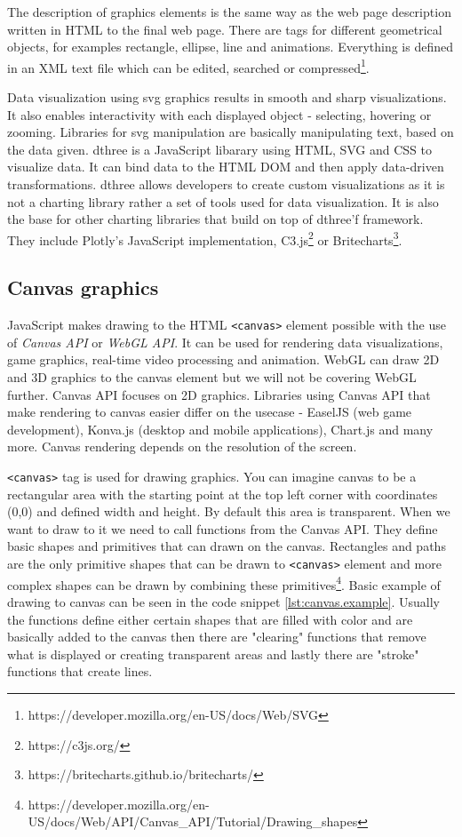 The description of graphics elements is the same way as the web page description written in HTML to the final web page. There are tags for different geometrical objects, for examples rectangle, ellipse, line and animations. Everything is defined in an XML text file which can be edited, searched or compressed\footnote{https://developer.mozilla.org/en-US/docs/Web/SVG}.

Data visualization using \ac{svg} graphics results in smooth and sharp visualizations. It also enables interactivity with each displayed object - selecting, hovering or zooming. Libraries for \ac{svg} manipulation are basically manipulating text, based on the data given. \ac{dthree} is a JavaScript libarary using HTML, SVG and CSS to visualize data. It can bind data to the HTML DOM and then apply data-driven transformations. \ac{dthree} allows developers to create custom visualizations as it is not a charting library rather a set of tools used for data visualization. It is also the base for other charting libraries that build on top of \ac{dthree}'f framework. They include Plotly's JavaScript implementation, C3.js\footnote{https://c3js.org/} or Britecharts\footnote{https://britecharts.github.io/britecharts/}.

\subsection{Canvas graphics}

JavaScript makes drawing to the HTML \verb|<canvas>| element possible with the use of \textit{Canvas API} or \textit{WebGL API}. It can be used for rendering data visualizations, game graphics, real-time video processing and animation. WebGL can draw 2D and 3D graphics to the canvas element but we will not be covering WebGL further. Canvas API focuses on 2D graphics. Libraries using Canvas API that make rendering to canvas easier differ on the usecase - EaselJS (web game development), Konva.js (desktop and mobile applications), Chart.js and many more. Canvas rendering depends on the resolution of the screen. 

\verb|<canvas>| tag is used for drawing graphics. You can imagine canvas to be a rectangular area with the starting point at the top left corner with coordinates (0,0) and defined width and height. By default this area is transparent. When we want to draw to it we need to call functions from the Canvas API. They define basic shapes and primitives that can drawn on the canvas. Rectangles and paths are the only primitive shapes that can be drawn to \verb|<canvas>| element and more complex shapes can be drawn by combining these primitives\footnote{https://developer.mozilla.org/en-US/docs/Web/API/Canvas\_API/Tutorial/Drawing\_shapes}. Basic example of drawing to canvas can be seen in the code snippet \ref{lst:canvas.example}. Usually the functions define either certain shapes that are filled with color and are basically added to the canvas then there are "clearing" functions that remove what is displayed or creating transparent areas and lastly there are "stroke" functions that create lines. 

